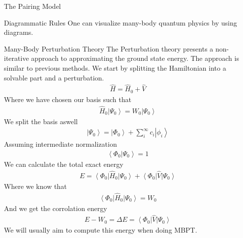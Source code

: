 \documentclass[twoside,english]{uiofysmaster}
\begin{document}
\begin{chapter}{The Pairing Model}
 \begin{section}{Diagrammatic Rules}
 	One can visualize many-body quantum physics by using diagrams. 

 	
 \end{section}

 \begin{section}{Many-Body Perturbation Theory}
 	The Perturbation theory presents a non-iterative approach to approximating the ground state energy. The approach is similar to previous methods. We start by splitting the Hamiltonian into a solvable part and a perturbation. 
 	\begin{align}
 		\hat H = \hat H_0 + \hat V
 	\end{align}
 	Where we have chosen our basis such that
 	\begin{align}
 		\hat H_0 \left| \Psi_0 \right>  = W_0 \left| \Psi_0 \right>
 	\end{align}
 	We split the basis aswell
 	\begin{align}
 		\left| \Psi_0 \right> = \left| \Phi_0 \right> + \sum_i^{\infty} c_i \left| \phi_i \right>
 	\end{align}
 	Assuming intermediate normalization
 	\begin{align}
 		\left< \Phi_0 | \Psi_0 \right> = 1
 	\end{align}
	We can calculate the total exact energy
 	\begin{align}
 		E = \left< \Phi_0 \right| \hat H_0 \left| \Psi_0 \right> + \left< \Phi_0 \right| \hat V \left| \Psi_0 \right>
 	\end{align}
 	Where we know that
 	\begin{align}
 		 \left< \Phi_0 \right| \hat H_0 \left| \Psi_0 \right>  = W_0
 	\end{align}
 	And we get the corrolation energy
 	\begin{align}
 		E - W_0 = \Delta E = \left< \Phi_0 \right| \hat V \left| \Psi_0 \right>
 	\end{align}
 	We will usually aim to compute this energy when doing MBPT. 


\end{section}
\end{chapter}
\end{document}
